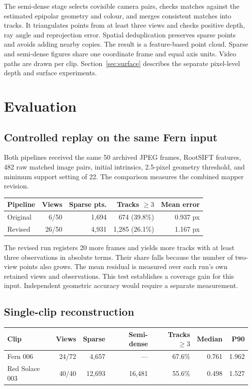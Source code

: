 \documentclass[11pt,a4paper]{article}
\begin{document}
The semi-dense stage selects covisible camera pairs, checks matches against
the estimated epipolar geometry and colour, and merges consistent matches
into tracks. It triangulates points from at least three views and checks
positive depth, ray angle and reprojection error. Spatial deduplication
preserves sparse points and avoids adding nearby copies. The result is a
feature-based point cloud. Sparse and semi-dense figures share one coordinate
frame and equal axis units. Video paths are drawn per clip. Section~\ref{sec:surface}
describes the separate pixel-level depth and surface experiments.

\section{Evaluation}
\label{sec:evaluation}
\subsection{Controlled replay on the same Fern input}
Both pipelines received the same 50 archived JPEG frames, RootSIFT features,
482 raw matched image pairs, initial intrinsics, 2.5-pixel geometry threshold,
and minimum support setting of 22. The comparison measures the combined
mapper revision.

\begin{center}
\small
\begin{tabularx}{\linewidth}{@{}Yrrrr@{}}
\toprule
\textbf{Pipeline} & \textbf{Views} & \textbf{Sparse pts.} &
\textbf{Tracks \(\geq 3\)} & \textbf{Mean error}\\
\midrule
Original & 6/50 & 1,694 & 674 (39.8\%) & 0.937 px\\
Revised & 26/50 & 4,931 & 1,285 (26.1\%) & 1.167 px\\
\bottomrule
\end{tabularx}
\end{center}

The revised run registers 20 more frames and yields more tracks with at least
three observations in absolute terms. Their share falls because the number of
two-view points also grows. The mean residual is measured over each run's own
retained views and observations. This test establishes a coverage gain for this
input. Independent geometric accuracy would require a separate measurement.

\subsection{Single-clip reconstruction}
\begin{center}
\small
\begin{tabularx}{\linewidth}{@{}Yrrrrrr@{}}
\toprule
\textbf{Clip} & \textbf{Views} & \textbf{Sparse} & \textbf{Semi-dense} &
\textbf{Tracks \(\geq 3\)} & \textbf{Median} & \textbf{P90}\\
\midrule
Fern 006 & 24/72 & 4,657 & --- & 67.6\% & 0.761 & 1.962\\
Red Solace 003 & 40/40 & 12,693 & 16,481 & 55.6\% & 0.498 & 1.527\\
\bottomrule
\end{tabularx}
\end{center}
\end{document}
